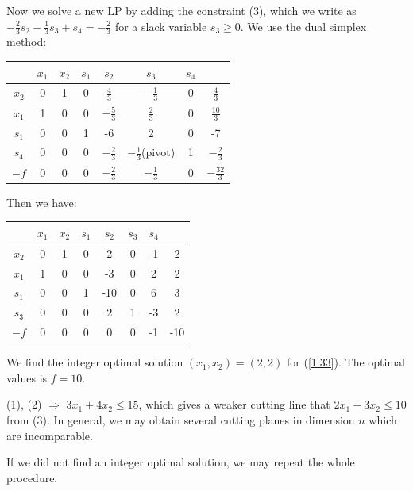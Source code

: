Now we solve a new LP by adding the constraint (3), which we write as $-\frac{2}{3}s_2-\frac{1}{3}s_3+s_4=-\frac{2}{3}$ for a slack variable $s_3\geqslant 0$. We use the dual simplex method:
\begin{table}[H]
    \centering
    \begin{tabular}{c|cccccc|c}
            & $x_1$ & $x_2$ & $s_1$ & $s_2$ & $s_3$ & $s_4$ & \\ \hline
            $x_2$ & 0 & 1 & 0 & $\frac{4}{3}$ & $-\frac{1}{3}$ & 0 & $\frac{4}{3}$\\
            $x_1$ & 1 & 0 & 0 & $-\frac{5}{3}$ & $\frac{2}{3}$ & 0 & $\frac{10}{3}$ \\
            $s_1$ & 0 & 0 & 1 & -6 & 2 & 0 & -7\\
            $s_4$ & 0 & 0 & 0 & $-\frac{2}{3}$ & $-\frac{1}{3}$(pivot) & 1 & $-\frac{2}{3}$ \\ \hline
            $-f$ & 0 & 0 & 0 & $-\frac{2}{3}$ & $-\frac{1}{3}$ & 0 & $-\frac{32}{3}$
    \end{tabular}
\end{table}

Then we have:
\begin{table}[H]
    \centering
    \begin{tabular}{c|cccccc|c}
            & $x_1$ & $x_2$ & $s_1$ & $s_2$ & $s_3$ & $s_4$ & \\ \hline
            $x_2$ & 0 & 1 & 0 & 2 & 0 & -1 & 2\\
            $x_1$ & 1 & 0 & 0 & -3 & 0 & 2 & 2 \\
            $s_1$ & 0 & 0 & 1 & -10 & 0 & 6 & 3\\
            $s_3$ & 0 & 0 & 0 & 2 & 1 & -3 & 2 \\ \hline
            $-f$ & 0 & 0 & 0 & 0 & 0 & -1 & -10
    \end{tabular}
\end{table}

We find the integer optimal solution $(x_1, x_2) = (2, 2)$ for (\ref{1.33}). The optimal values is $f=10$.
\begin{remark}
    (1), (2) $\Longrightarrow$ $3x_1+4x_2\leqslant 15$, which gives a weaker cutting line that $2x_1+3x_2\leqslant 10$ from (3). In general, we may obtain several cutting planes in dimension $n$ which are incomparable.
    
    If we did not find an integer optimal solution, we may repeat the whole procedure.
\end{remark}

